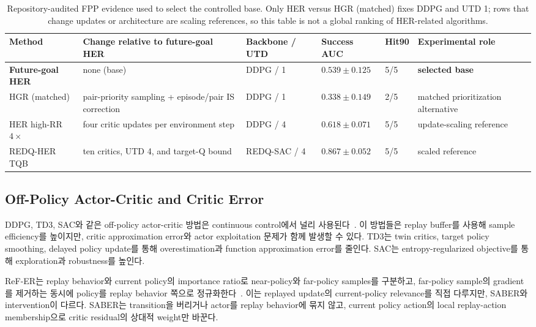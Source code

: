 \documentclass[letterpaper]{article}
\begin{document}
\begin{table}[t]
\centering
\small
\setlength{\tabcolsep}{3pt}
\caption{Repository-audited FPP evidence used to select the controlled base. Only HER versus HGR (matched) fixes DDPG and UTD 1; rows that change updates or architecture are scaling references, so this table is not a global ranking of HER-related algorithms.}
\label{tab:her-base-selection}
\begin{tabular}{@{}p{}p{}p{}p{}p{}p{}@{}}
\toprule
Method & Change relative to future-goal HER & Backbone / UTD & Success AUC & Hit90 & Experimental role \\
\midrule
\textbf{Future-goal HER} & none (base) & DDPG / 1 & \(0.539\pm0.125\) & 5/5 & \textbf{selected base} \\
HGR (matched) & pair-priority sampling + episode/pair IS correction & DDPG / 1 & \(0.338\pm0.149\) & 2/5 & matched prioritization alternative \\
HER high-RR \(4\times\) & four critic updates per environment step & DDPG / 4 & \(0.618\pm0.071\) & 5/5 & update-scaling reference \\
REDQ-HER TQB & ten critics, UTD 4, and target-Q bound & REDQ-SAC / 4 & \(0.867\pm0.052\) & 5/5 & scaled reference \\
\bottomrule
\end{tabular}
\end{table}

\subsection{Off-Policy Actor-Critic and Critic Error}

DDPG, TD3, SAC와 같은 off-policy actor-critic 방법은 continuous control에서 널리 사용된다~\citep{lillicrap2015ddpg,fujimoto2018td3,haarnoja2018sac}. 이 방법들은 replay buffer를 사용해 sample efficiency를 높이지만, critic approximation error와 actor exploitation 문제가 함께 발생할 수 있다. TD3는 twin critics, target policy smoothing, delayed policy update를 통해 overestimation과 function approximation error를 줄인다. SAC는 entropy-regularized objective를 통해 exploration과 robustness를 높인다.

ReF-ER는 replay behavior와 current policy의 importance ratio로 near-policy와 far-policy samples를 구분하고, far-policy sample의 gradient를 제거하는 동시에 policy를 replay behavior 쪽으로 정규화한다~\citep{novati2019refer}. 이는 replayed update의 current-policy relevance를 직접 다루지만, SABER와 intervention이 다르다. SABER는 transition을 버리거나 actor를 replay behavior에 묶지 않고, current policy action의 local replay-action membership으로 critic residual의 상대적 weight만 바꾼다.
\end{document}
